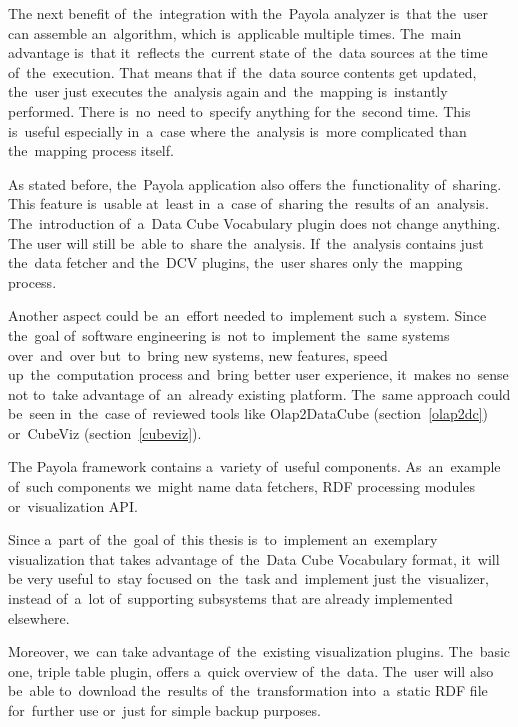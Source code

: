 The next benefit of~the~integration with the~Payola analyzer is~that the~user 
can assemble an~algorithm, which is~applicable multiple times. The~main 
advantage is~that it~reflects the~current state of~the~data sources at
the time of~the~execution. That means that if~the~data source contents get 
updated, the~user just executes the~analysis again and~the~mapping is~instantly 
performed. There is~no~need to~specify anything for the~second time.
This is~useful especially in~a~case where the~analysis is~more complicated than the~mapping process itself.

As stated before, the~Payola application also offers the~functionality of~sharing. This feature is~usable at~least in~a~case of~sharing the~results 
of an~analysis. The~introduction of~a~Data Cube Vocabulary plugin does not change anything.
The user will still be~able to~share the~analysis. If~the~analysis contains just the~data fetcher 
and the~DCV plugins, the~user shares only the~mapping process.

Another aspect could be~an~effort needed to~implement such a~system. Since the~goal of~software engineering is~not to~implement the~same systems over~and~over 
but~to~bring new systems, new features, speed up~the~computation process and~bring better user experience, it~makes no~sense not to~take advantage of~an~already existing platform. The~same approach could be~seen in~the~case of~reviewed 
tools like Olap2DataCube (section~\ref{olap2dc}) or~CubeViz 
(section~\ref{cubeviz}).

The Payola framework contains a~variety of~useful components. As~an~example of~such components we~might name data fetchers, RDF processing modules or~visualization API.

Since a~part of~the~goal of~this thesis is~to~implement an~exemplary 
visualization that takes advantage of~the~Data Cube Vocabulary format, it~will 
be very useful to~stay focused on~the~task and~implement just the~visualizer, 
instead of~a~lot of~supporting subsystems that are already 
implemented elsewhere.

Moreover, we~can take advantage of~the~existing visualization plugins. The~basic 
one, triple table plugin, offers a~quick overview of~the~data. The~user 
will also be~able to~download the~results of~the~transformation into~a~static 
RDF file for~further use or~just for simple backup purposes.

